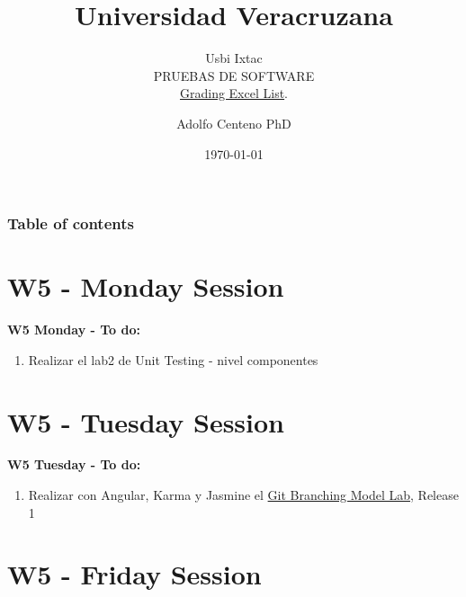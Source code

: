\documentclass{beamer}
\begin{document}
\title{Universidad Veracruzana}  
\subtitle{Usbi Ixtac\\PRUEBAS DE SOFTWARE\\\href{https://drive.google.com/file/d/1x-8DA-Xe7fQfKMPQY9XWx86y6o0Z-NRR/view?usp=sharing}{Grading Excel List}.
}
\author{Adolfo Centeno PhD}
\date{\today} 


\begin{frame}
\titlepage
\end{frame}

\begin{frame}\frametitle{Table of contents}
\tableofcontents
\end{frame} 


\section{W5 - Monday Session  }

\begin{frame}

\textbf{W5 Monday - To do:}

\begin{enumerate}
\item
	Realizar el lab2 de Unit Testing - nivel componentes

	

\end{enumerate} 

\end{frame}


\section{W5 - Tuesday Session }

\begin{frame}

\textbf{W5 Tuesday - To do:}

\begin{enumerate}
\item
	Realizar con Angular, Karma y Jasmine el 	\href{https://github.com/adsoftsito/tdd/blob/master/w3/gitbranchinglab.pdf}{Git Branching Model Lab}, Release 1 

\end{enumerate} 

\end{frame}


\section{W5 - Friday Session }
\end{document}
